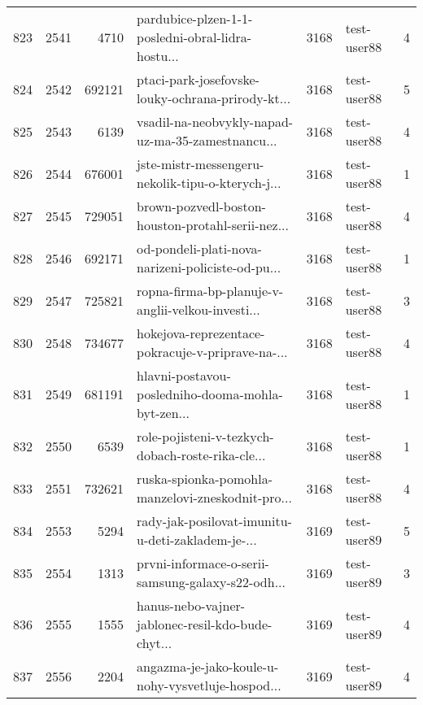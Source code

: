 \begin{tabular}{lrrlrlr}
823  &       2541 &     4710 &  pardubice-plzen-1-1-posledni-obral-lidra-hostu... &     3168 &                  test-user88 &               4 \\
824  &       2542 &   692121 &  ptaci-park-josefovske-louky-ochrana-prirody-kt... &     3168 &                  test-user88 &               5 \\
825  &       2543 &     6139 &  vsadil-na-neobvykly-napad-uz-ma-35-zamestnancu... &     3168 &                  test-user88 &               4 \\
826  &       2544 &   676001 &  jste-mistr-messengeru-nekolik-tipu-o-kterych-j... &     3168 &                  test-user88 &               1 \\
827  &       2545 &   729051 &  brown-pozvedl-boston-houston-protahl-serii-nez... &     3168 &                  test-user88 &               4 \\
828  &       2546 &   692171 &  od-pondeli-plati-nova-narizeni-policiste-od-pu... &     3168 &                  test-user88 &               1 \\
829  &       2547 &   725821 &  ropna-firma-bp-planuje-v-anglii-velkou-investi... &     3168 &                  test-user88 &               3 \\
830  &       2548 &   734677 &  hokejova-reprezentace-pokracuje-v-priprave-na-... &     3168 &                  test-user88 &               4 \\
831  &       2549 &   681191 &  hlavni-postavou-posledniho-dooma-mohla-byt-zen... &     3168 &                  test-user88 &               1 \\
832  &       2550 &     6539 &  role-pojisteni-v-tezkych-dobach-roste-rika-cle... &     3168 &                  test-user88 &               1 \\
833  &       2551 &   732621 &  ruska-spionka-pomohla-manzelovi-zneskodnit-pro... &     3168 &                  test-user88 &               4 \\
834  &       2553 &     5294 &  rady-jak-posilovat-imunitu-u-deti-zakladem-je-... &     3169 &                  test-user89 &               5 \\
835  &       2554 &     1313 &  prvni-informace-o-serii-samsung-galaxy-s22-odh... &     3169 &                  test-user89 &               3 \\
836  &       2555 &     1555 &  hanus-nebo-vajner-jablonec-resil-kdo-bude-chyt... &     3169 &                  test-user89 &               4 \\
837  &       2556 &     2204 &  angazma-je-jako-koule-u-nohy-vysvetluje-hospod... &     3169 &                  test-user89 &               4 \\

\end{tabular}
